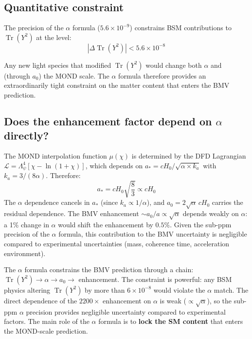\documentclass[12pt,a4paper]{article}
\newcommand{\Tr}{\operatorname{Tr}}
\begin{document}
\subsection{Quantitative constraint}

The precision of the $\alpha$ formula ($5.6 \times 10^{-9}$) constrains BSM contributions to $\Tr(Y^2)$ at the level:
\begin{equation}
|\Delta\Tr(Y^2)| < 5.6 \times 10^{-8}
\end{equation}

Any new light species that modified $\Tr(Y^2)$ would change both $\alpha$ and (through $a_0$) the MOND scale. The $\alpha$ formula therefore provides an extraordinarily tight constraint on the matter content that enters the BMV prediction.

\subsection{Does the enhancement factor depend on $\alpha$ directly?}

The MOND interpolation function $\mu(\chi)$ is determined by the DFD Lagrangian $\mathcal{L} = \Lambda_\psi^4[\chi - \ln(1+\chi)]$, which depends on $a_* = cH_0/\sqrt{\alpha \times k_a}$ with $k_a = 3/(8\alpha)$. Therefore:
\begin{equation}
a_* = cH_0\sqrt{\frac{8}{3}} \propto cH_0
\end{equation}
The $\alpha$ dependence cancels in $a_*$ (since $k_a \propto 1/\alpha$), and $a_0 = 2\sqrt{\alpha}\,cH_0$ carries the residual dependence. The BMV enhancement $\sim a_0/a \propto \sqrt{\alpha}$ depends weakly on $\alpha$: a 1\% change in $\alpha$ would shift the enhancement by $0.5\%$. Given the sub-ppm precision of the $\alpha$ formula, this contribution to the BMV uncertainty is negligible compared to experimental uncertainties (mass, coherence time, acceleration environment).

\begin{tcolorbox}[colback=blue!5!white, colframe=blue!60!black, title=Answer to Question 4]
The $\alpha$ formula constrains the BMV prediction through a chain: $\Tr(Y^2) \to \alpha \to a_0 \to$ enhancement. The constraint is powerful: any BSM physics altering $\Tr(Y^2)$ by more than $6 \times 10^{-8}$ would violate the $\alpha$ match. The direct dependence of the $2200\times$ enhancement on $\alpha$ is weak ($\propto \sqrt{\alpha}$), so the sub-ppm $\alpha$ precision provides negligible uncertainty compared to experimental factors. The main role of the $\alpha$ formula is to \textbf{lock the SM content} that enters the MOND-scale prediction.
\end{tcolorbox}
\end{document}
